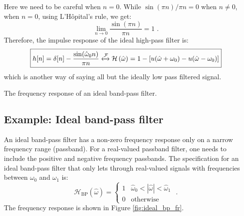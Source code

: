 Here we need to be careful when $n=0$. While $\sin(\pi n)/\pi n = 0$ when $n\ne 0$, when $n=0$, using L'H\^opital's rule, we get:
\begin{equation}
  \lim_{n\rightarrow 0} \frac{\sin(\pi n)}{\pi n} = 1\,\,.
\end{equation}
Therefore, the impulse response of the ideal high-pass filter is:
\begin{equation}
  \boxed{
  h[n]=\delta[n] - \frac{\sin(\hat{\omega}_0 n)}{\pi n} \xleftrightarrow{\mathcal{F}} \mathcal{H}\left(\hat{\omega}\right) = 1-[u(\hat{\omega}+\omega_0)-u(\hat{\omega}-\omega_0)]
  }
\end{equation}
which is another way of saying all but the ideally low pass filtered
signal.

\begin{marginfigure}
  \begin{center}
  \end{center}
  \caption{The frequency response of an ideal band-pass filter.}
  \label{fig:ideal_bp_fr}
\end{marginfigure}

\subsection{Example: Ideal band-pass filter}
An ideal band-pass filter has a non-zero frequency response only on a
narrow frequency range (passband). For a real-valued passband
filter, one needs to include the positive and negative frequency passbands.
The specification for an ideal band-pass filter that
only lets through real-valued signals with frequencies between $\omega_0$ and
$\omega_1$ is:
\begin{equation}
  \mathcal{H}_{\mathrm{BP}}(\hat{\omega}) = \left\{ \begin{array}{cc}
    1 & \hat{\omega}_0 < |\hat{\omega}| < \hat{\omega}_1 \\
    0 & \mathrm{otherwise}
  \end{array}\right.\,\,.
\end{equation}
The frequency response is shown in Figure \ref{fig:ideal_bp_fr}.

